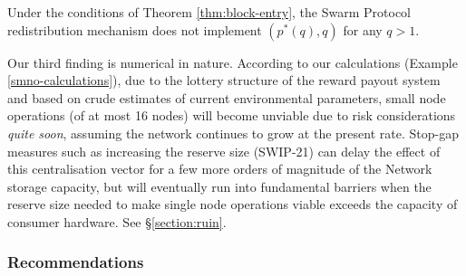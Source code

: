 \begin{corollary}

  Under the conditions of Theorem \ref{thm:block-entry}, the Swarm Protocol redistribution mechanism does not implement $(p^*(q),q)$ for any $q>1$.

\end{corollary}


Our third finding is numerical in nature.
%
According to our calculations (Example \ref{smno-calculations}), due to the lottery structure of the reward payout system and based on crude estimates of current environmental parameters, small node operations (of at most 16 nodes) will become unviable due to risk considerations \emph{quite soon}, assuming the network continues to grow at the present rate.
%
Stop-gap measures such as increasing the reserve size (SWIP-21) can delay the effect of this centralisation vector for a few more orders of magnitude of the Network storage capacity, but will eventually run into fundamental barriers when the reserve size needed to make single node operations viable exceeds the capacity of consumer hardware.
%
See \S\ref{section:ruin}.



\subsubsection{Recommendations}
\label{section:recommendations}

